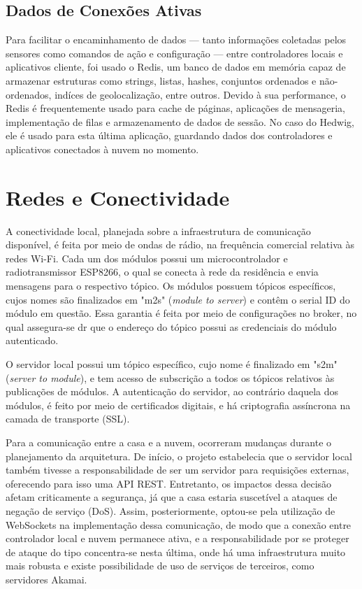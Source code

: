 \subsection{Dados de Conexões Ativas}

Para facilitar o encaminhamento de dados --- tanto informações coletadas pelos sensores como comandos de ação e configuração --- entre controladores locais e aplicativos cliente, foi usado o Redis, um banco de dados em memória capaz de armazenar estruturas como strings, listas, hashes, conjuntos ordenados e não-ordenados, indíces de geolocalização, entre outros. Devido à sua performance, o Redis é frequentemente usado para cache de páginas, aplicações de mensageria, implementação de filas e armazenamento de dados de sessão. No caso do Hedwig, ele é usado para esta última aplicação, guardando dados dos controladores e aplicativos conectados à nuvem no momento.

\section{Redes e Conectividade}

A conectividade local, planejada sobre a infraestrutura de comunicação disponível, é feita por meio de ondas de rádio, na frequência comercial relativa às redes Wi-Fi. Cada um dos módulos possui um microcontrolador e radiotransmissor ESP8266, o qual se conecta à rede da residência e envia mensagens para o respectivo tópico. Os módulos possuem tópicos específicos, cujos nomes são finalizados em "m2s" (\emph{module to server}) e contêm o serial ID do módulo em questão. Essa garantia é feita por meio de configurações no broker, no qual assegura-se dr que o endereço do tópico possui as credenciais do módulo autenticado.

O servidor local possui um tópico específico, cujo nome é finalizado em "s2m" (\emph{server to module}), e tem acesso de subscrição a todos os tópicos relativos às publicações de módulos. A autenticação do servidor, ao contrário daquela dos módulos, é feito por meio de certificados digitais, e há criptografia assíncrona na camada de transporte (SSL).

Para a comunicação entre a casa e a nuvem, ocorreram mudanças durante o planejamento da arquitetura. De início, o projeto estabelecia que o servidor local também tivesse a responsabilidade de ser um servidor para requisições externas, oferecendo para isso uma API REST. Entretanto, os impactos dessa decisão afetam criticamente a segurança, já que a casa estaria suscetível a ataques de negação de serviço (DoS). Assim, posteriormente, optou-se pela utilização de WebSockets na implementação dessa comunicação, de modo que a conexão entre controlador local e nuvem permanece ativa, e a responsabilidade por se proteger de ataque do tipo concentra-se nesta última, onde há uma infraestrutura muito mais robusta e existe possibilidade de uso de serviços de terceiros, como servidores Akamai.

